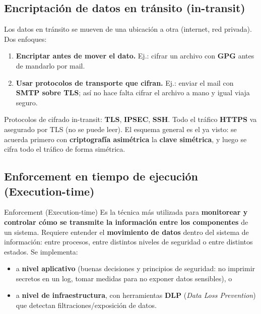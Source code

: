 \documentclass[11pt,a4paper]{article}
\begin{document}
\subsection{Encriptación de datos en tránsito (in-transit)}

Los datos en tránsito se mueven de una ubicación a otra (internet, red privada). Dos enfoques:

\begin{enumerate}[leftmargin=1.6em,itemsep=2pt]
  \item \textbf{Encriptar antes de mover el dato.} Ej.: cifrar un archivo con \textbf{GPG}
        antes de mandarlo por mail.
  \item \textbf{Usar protocolos de transporte que cifran.} Ej.: enviar el mail con
        \textbf{SMTP sobre TLS}; así no hace falta cifrar el archivo a mano y igual viaja
        seguro.
\end{enumerate}

\noindent Protocolos de cifrado in-transit: \textbf{TLS}, \textbf{IPSEC}, \textbf{SSH}. Todo el
tráfico \textbf{HTTPS} va asegurado por TLS (no se puede leer). El esquema general es el ya
visto: se acuerda primero con \textbf{criptografía asimétrica} la \textbf{clave simétrica}, y
luego se cifra todo el tráfico de forma simétrica.

\subsection{Enforcement en tiempo de ejecución (Execution-time)}

\begin{defbox}{Enforcement (Execution-time)}
Es la técnica más utilizada para \textbf{monitorear y controlar cómo se transmite la
información entre los componentes} de un sistema. Requiere entender el \textbf{movimiento de
datos} dentro del sistema de información: entre procesos, entre distintos niveles de seguridad
o entre distintos estados. Se implementa:
\begin{itemize}[leftmargin=1.4em,topsep=2pt,itemsep=1pt]
  \item a \textbf{nivel aplicativo} (buenas decisiones y principios de seguridad: no imprimir
        secretos en un log, tomar medidas para no exponer datos sensibles), o
  \item a \textbf{nivel de infraestructura}, con herramientas \textbf{DLP} (\emph{Data Loss
        Prevention}) que detectan filtraciones/exposición de datos.
\end{itemize}
\end{defbox}
\end{document}
